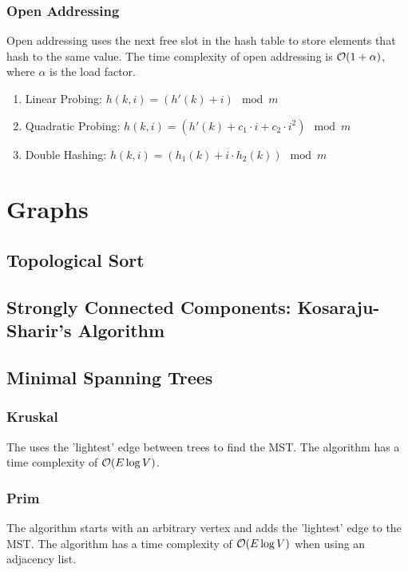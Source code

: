 \documentclass{article}
\begin{document}
\subsubsection{Open Addressing}\label{sec:openAddressing}
Open addressing uses the next free slot in the hash table to store elements that hash to the same value. The time complexity of open addressing is $\mathcal{O}(1+\alpha)$, where $\alpha$ is the load factor.
\begin{enumerate}
  \item Linear Probing: $h(k,i) = (h'(k) + i) \mod m$
  \item Quadratic Probing: $h(k,i) = (h'(k) + c_1\cdot i + c_2\cdot i^2) \mod m$
  \item Double Hashing: $h(k,i) = (h_1(k) + i\cdot h_2(k)) \mod m$
\end{enumerate}



\section{Graphs}
\subsection{Topological Sort}


\subsection{Strongly Connected Components: Kosaraju-Sharir's Algorithm}


\subsection{Minimal Spanning Trees}
\subsubsection{Kruskal}
The  uses the 'lightest' edge between trees to find the MST. The algorithm has a time complexity of $\mathcal{O}(E\log V)$.\par



\subsubsection{Prim}
The  algorithm starts with an arbitrary vertex and adds the 'lightest' edge to the MST. The algorithm has a time complexity of $\mathcal{O}(E\log V)$ when using an adjacency list.\par

\end{document}
